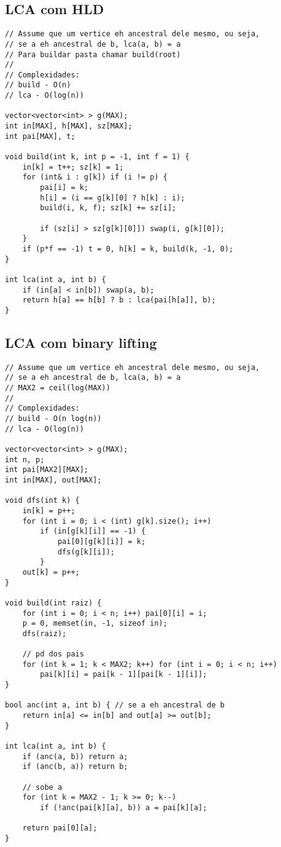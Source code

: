 \documentclass[12pt, a4paper, twoside]{article}
\begin{document}
\subsection{LCA com HLD}
\begin{lstlisting}
// Assume que um vertice eh ancestral dele mesmo, ou seja,
// se a eh ancestral de b, lca(a, b) = a
// Para buildar pasta chamar build(root)
//
// Complexidades:
// build - O(n)
// lca - O(log(n))

vector<vector<int> > g(MAX);
int in[MAX], h[MAX], sz[MAX];
int pai[MAX], t;

void build(int k, int p = -1, int f = 1) {
	in[k] = t++; sz[k] = 1;
	for (int& i : g[k]) if (i != p) {
		pai[i] = k;
		h[i] = (i == g[k][0] ? h[k] : i);
		build(i, k, f); sz[k] += sz[i];
		
		if (sz[i] > sz[g[k][0]]) swap(i, g[k][0]);
	}
	if (p*f == -1) t = 0, h[k] = k, build(k, -1, 0);
}

int lca(int a, int b) {
	if (in[a] < in[b]) swap(a, b);
	return h[a] == h[b] ? b : lca(pai[h[a]], b);
}
\end{lstlisting}

\subsection{LCA com binary lifting}
\begin{lstlisting}
// Assume que um vertice eh ancestral dele mesmo, ou seja,
// se a eh ancestral de b, lca(a, b) = a
// MAX2 = ceil(log(MAX))
//
// Complexidades:
// build - O(n log(n))
// lca - O(log(n))

vector<vector<int> > g(MAX);
int n, p;
int pai[MAX2][MAX];
int in[MAX], out[MAX];

void dfs(int k) {
	in[k] = p++;
	for (int i = 0; i < (int) g[k].size(); i++)
		if (in[g[k][i]] == -1) {
			pai[0][g[k][i]] = k;
			dfs(g[k][i]);
		}
	out[k] = p++;
}

void build(int raiz) {
	for (int i = 0; i < n; i++) pai[0][i] = i;
	p = 0, memset(in, -1, sizeof in);
	dfs(raiz);

	// pd dos pais
	for (int k = 1; k < MAX2; k++) for (int i = 0; i < n; i++)
		pai[k][i] = pai[k - 1][pai[k - 1][i]];
}

bool anc(int a, int b) { // se a eh ancestral de b
	return in[a] <= in[b] and out[a] >= out[b];
}

int lca(int a, int b) {
	if (anc(a, b)) return a;
	if (anc(b, a)) return b;

	// sobe a
	for (int k = MAX2 - 1; k >= 0; k--)
		if (!anc(pai[k][a], b)) a = pai[k][a];

	return pai[0][a];
}
\end{lstlisting}
\end{document}
